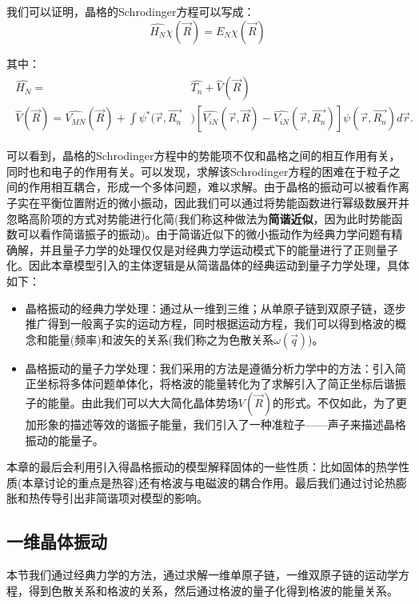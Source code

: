 \documentclass{ctexart}
\begin{document}
        我们可以证明，晶格的Schrodinger方程可以写成：
        \begin{equation}
            \hat{H_N}\chi(\vec{R})=E_N\chi(\vec{R})
        \end{equation}
            
        其中：
        \begin{align}
            \begin{split}
                \hat{H_N}=&\hat{T_n}+\hat{V}(\vec{R})\\
                \hat{V}(\vec{R})=\hat{V_{MN}}(\vec{R})+\int\psi^*(\vec{r},\vec{R_n}&)[\hat{V_{iN}}(\vec{r},\vec{R})-\hat{V_{iN}}(\vec{r},\vec{R_n})]\psi(\vec{r},\vec{R_n})d\vec{r}.
            \end{split}
        \end{align}
    
        可以看到，晶格的Schrodinger方程中的势能项不仅和晶格之间的相互作用有关，同时也和电子的作用有关。可以发现，求解该Schrodinger方程的困难在于粒子之间的作用相互耦合，形成一个多体问题，难以求解。由于晶格的振动可以被看作离子实在平衡位置附近的微小振动，因此我们可以通过将势能函数进行幂级数展开并忽略高阶项的方式对势能进行化简(我们称这种做法为\textbf{简谐近似}，因为此时势能函数可以看作简谐振子的振动)。由于简谐近似下的微小振动作为经典力学问题有精确解，并且量子力学的处理仅仅是对经典力学运动模式下的能量进行了正则量子化。因此本章模型引入的主体逻辑是从简谐晶体的经典运动到量子力学处理，具体如下：
        \begin{itemize}
            \item 晶格振动的经典力学处理：通过从一维到三维；从单原子链到双原子链，逐步推广得到一般离子实的运动方程，同时根据运动方程，我们可以得到格波的概念和能量(频率)和波矢的关系(我们称之为色散关系$\omega(\vec{q})$)。
            \item 晶格振动的量子力学处理：我们采用的方法是遵循分析力学中的方法：引入简正坐标将多体问题单体化，将格波的能量转化为了求解引入了简正坐标后谐振子的能量。由此我们可以大大简化晶体势场$V(\vec{R})$的形式。不仅如此，为了更加形象的描述等效的谐振子能量，我们引入了一种准粒子——声子来描述晶格振动的能量子。
        \end{itemize}
        
        本章的最后会利用引入得晶格振动的模型解释固体的一些性质：比如固体的热学性质(本章讨论的重点是热容)还有格波与电磁波的耦合作用。最后我们通过讨论热膨胀和热传导引出非简谐项对模型的影响。
        \subsection{一维晶体振动}
            本节我们通过经典力学的方法，通过求解一维单原子链，一维双原子链的运动学方程，得到色散关系和格波的关系，然后通过格波的量子化得到格波的能量关系。
\end{document}
